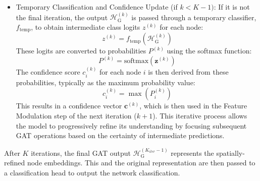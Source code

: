 \begin{itemize}
  \item Temporary Classification and Confidence Update (if \(k < K-1)\):
    If it is not the final iteration, the output \(\mathcal{H}_{\text{G}}^{(k)}\) is passed through a temporary classifier, \(f_{\text{temp}}\), to obtain intermediate class logits \(z^{(k)}\) for each node:
    \begin{equation}
      z^{(k)} = f_{\text{temp}}(\mathcal{H}_{\text{G}}^{(k)})
    \end{equation}
    These logits are converted to probabilities $P^{(k)}$ using the softmax function:
    \begin{equation}
      P^{(k)} = \text{softmax}(\mathbf{z}^{(k)})
    \end{equation}
    The confidence score $c_i^{(k)}$ for each node $i$ is then derived from these probabilities, typically as the maximum probability value:
    \begin{equation}
      c_i^{(k)} = \max(P_i^{(k)})
    \end{equation}
    This results in a confidence vector $\mathbf{c}^{(k)}$, which is then used in the Feature Modulation step of the next iteration ($k+1$). This iterative process allows the model to progressively refine its understanding by focusing subsequent GAT operations based on the certainty of intermediate predictions.
\end{itemize}

After \(K\) iterations, the final GAT output $\mathcal{H}_{\text{G}}^{(K_{iter}-1)}$ represents the spatially-refined node embeddings. This and the original representation are then passed to a classification head to output the network classification.

